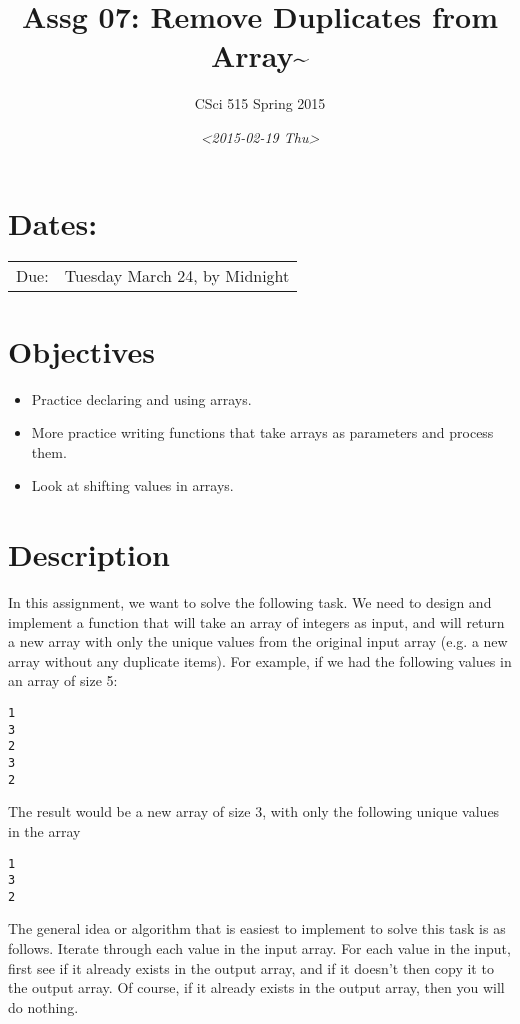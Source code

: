 \documentclass[11pt]{article}
\author{CSci 515 Spring 2015}
\date{\textit{<2015-02-19 Thu>}}
\title{Assg 07: Remove Duplicates from Array\textasciitilde{}}
\begin{document}
\maketitle

\section*{Dates:}
\label{sec-1}
\begin{center}
\begin{tabular}{ll}
Due: & Tuesday March 24, by Midnight\\
\end{tabular}
\end{center}
\section*{Objectives}
\label{sec-2}
\begin{itemize}
\item Practice declaring and using arrays.
\item More practice writing functions that take arrays as parameters and
process them.
\item Look at shifting values in arrays.
\end{itemize}
\section*{Description}
\label{sec-3}
In this assignment, we want to solve the following task.  We need to design
and implement a function that will take an array of integers as input, and
will return a new array with only the unique values from the original
input array (e.g. a new array without any duplicate items).  For example,
if we had the following values in an array of size 5:

\begin{verbatim}
1
3
2
3
2
\end{verbatim}

The result would be a new array of size 3, with only the following unique
values in the array

\begin{verbatim}
1
3
2
\end{verbatim}

The general idea or algorithm that is easiest to implement to solve
this task is as follows.  Iterate through each value in the input
array.  For each value in the input, first see if it already exists in
the output array, and if it doesn't then copy it to the output array.
Of course, if it already exists in the output array, then you will do
nothing.
\end{document}
